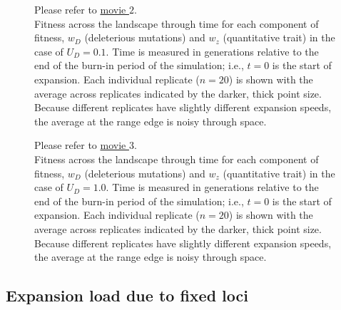\begin{figure}[h!]
\caption[ ~ - Fitness across the landscape through time for each component of fitness for $U_D = 0.1$.]{Please refer to \href{http://www.zoology.ubc.ca/~kgilbert/PopFitness_U0p1.mp4}{movie $2$}. \\ Fitness across the landscape through time for each component of fitness, $w_D$ (deleterious mutations) and $w_z$ (quantitative trait) in the case of $U_D = 0.1$. Time is measured in generations relative to the end of the burn-in period of the simulation; i.e., $t = 0$ is the start of expansion. Each individual replicate ($n = 20$) is shown with the average across replicates indicated by the darker, thick point size. Because different replicates have slightly different expansion speeds, the average at the range edge is noisy through space.}
\label{fig:fitmov2}
\end{figure}

\begin{figure}[h!]
\caption[ ~ - Fitness across the landscape through time for each component of fitness for $U_D = 1.0$.]{Please refer to \href{http://www.zoology.ubc.ca/~kgilbert/PopFitness_U1.mp4}{movie $3$}. \\ Fitness across the landscape through time for each component of fitness, $w_D$ (deleterious mutations) and $w_z$ (quantitative trait) in the case of $U_D = 1.0$. Time is measured in generations relative to the end of the burn-in period of the simulation; i.e., $t = 0$ is the start of expansion. Each individual replicate ($n = 20$) is shown with the average across replicates indicated by the darker, thick point size. Because different replicates have slightly different expansion speeds, the average at the range edge is noisy through space.}
\label{fig:fitmov3}
\end{figure}


\newpage{}


\subsection*{Expansion load due to fixed loci}



